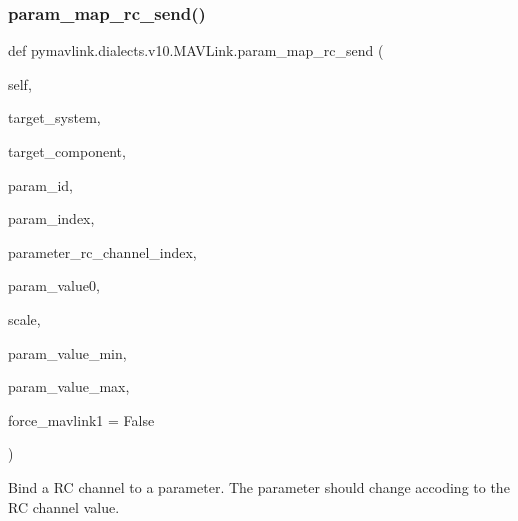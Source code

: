 \begin{DoxyVerb}
\begin{DoxyVerb}
\begin{DoxyVerb}
\begin{DoxyVerb}
\subsubsection{\texorpdfstring{param\+\_\+map\+\_\+rc\+\_\+send()}{param\_map\_rc\_send()}}
{\footnotesize\ttfamily def pymavlink.\+dialects.\+v10.\+M\+A\+V\+Link.\+param\+\_\+map\+\_\+rc\+\_\+send (\begin{DoxyParamCaption}\item[{}]{self,  }\item[{}]{target\+\_\+system,  }\item[{}]{target\+\_\+component,  }\item[{}]{param\+\_\+id,  }\item[{}]{param\+\_\+index,  }\item[{}]{parameter\+\_\+rc\+\_\+channel\+\_\+index,  }\item[{}]{param\+\_\+value0,  }\item[{}]{scale,  }\item[{}]{param\+\_\+value\+\_\+min,  }\item[{}]{param\+\_\+value\+\_\+max,  }\item[{}]{force\+\_\+mavlink1 = {\ttfamily False} }\end{DoxyParamCaption})}

\begin{DoxyVerb}Bind a RC channel to a parameter. The parameter should change accoding
to the RC channel value.


\end{DoxyVerb}
\end{DoxyVerb}
\end{DoxyVerb}
\end{DoxyVerb}
\end{DoxyVerb}
